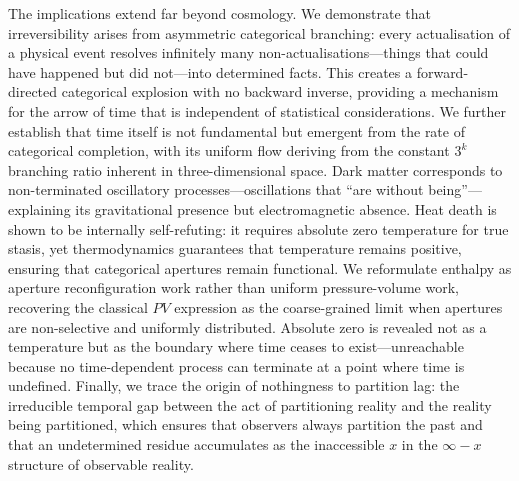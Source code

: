 The implications extend far beyond cosmology. We demonstrate that irreversibility arises from asymmetric categorical branching: every actualisation of a physical event resolves infinitely many non-actualisations—things that could have happened but did not—into determined facts. This creates a forward-directed categorical explosion with no backward inverse, providing a mechanism for the arrow of time that is independent of statistical considerations. We further establish that time itself is not fundamental but emergent from the rate of categorical completion, with its uniform flow deriving from the constant $3^k$ branching ratio inherent in three-dimensional space. Dark matter corresponds to non-terminated oscillatory processes—oscillations that ``are without being''—explaining its gravitational presence but electromagnetic absence. Heat death is shown to be internally self-refuting: it requires absolute zero temperature for true stasis, yet thermodynamics guarantees that temperature remains positive, ensuring that categorical apertures remain functional. We reformulate enthalpy as aperture reconfiguration work rather than uniform pressure-volume work, recovering the classical $PV$ expression as the coarse-grained limit when apertures are non-selective and uniformly distributed. Absolute zero is revealed not as a temperature but as the boundary where time ceases to exist—unreachable because no time-dependent process can terminate at a point where time is undefined. Finally, we trace the origin of nothingness to partition lag: the irreducible temporal gap between the act of partitioning reality and the reality being partitioned, which ensures that observers always partition the past and that an undetermined residue accumulates as the inaccessible $x$ in the $\infty - x$ structure of observable reality.

